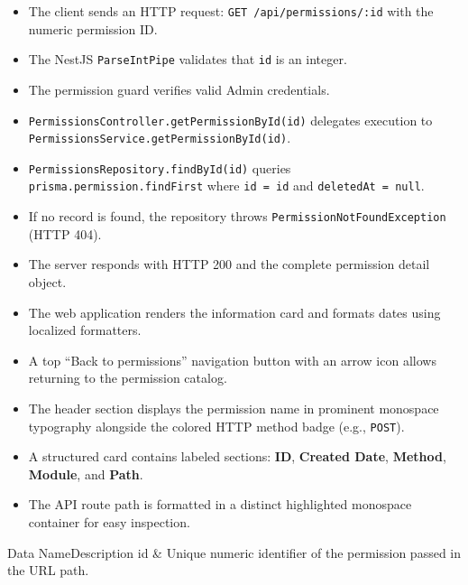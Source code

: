 \begin{itemize}[leftmargin=1.6em,topsep=3pt,itemsep=2pt,parsep=0pt,label=$\bullet$]
    \item The client sends an HTTP request: \texttt{GET /api/permissions/:id} with the numeric permission ID.
    \item The NestJS \texttt{ParseIntPipe} validates that \texttt{id} is an integer.
    \item The permission guard verifies valid Admin credentials.
    \item \texttt{PermissionsController.getPermissionById(id)} delegates execution to \texttt{PermissionsService.getPermissionById(id)}.
    \item \texttt{PermissionsRepository.findById(id)} queries \texttt{prisma.permission.findFirst} where \texttt{id = id} and \texttt{deletedAt = null}.
    \item If no record is found, the repository throws \texttt{PermissionNotFoundException} (HTTP 404).
    \item The server responds with HTTP 200 and the complete permission detail object.
    \item The web application renders the information card and formats dates using localized formatters.
\end{itemize}

\begin{itemize}[leftmargin=1.6em,topsep=3pt,itemsep=2pt,parsep=0pt,label=$\bullet$]
    \item A top ``Back to permissions'' navigation button with an arrow icon allows returning to the permission catalog.
    \item The header section displays the permission name in prominent monospace typography alongside the colored HTTP method badge (e.g., \texttt{POST}).
    \item A structured card contains labeled sections: \textbf{ID}, \textbf{Created Date}, \textbf{Method}, \textbf{Module}, and \textbf{Path}.
    \item The API route path is formatted in a distinct highlighted monospace container for easy inspection.
\end{itemize}


\begin{specdatatable}{Data Name}{Description}
id & Unique numeric identifier of the permission passed in the URL path.\\ \hline
\end{specdatatable}

